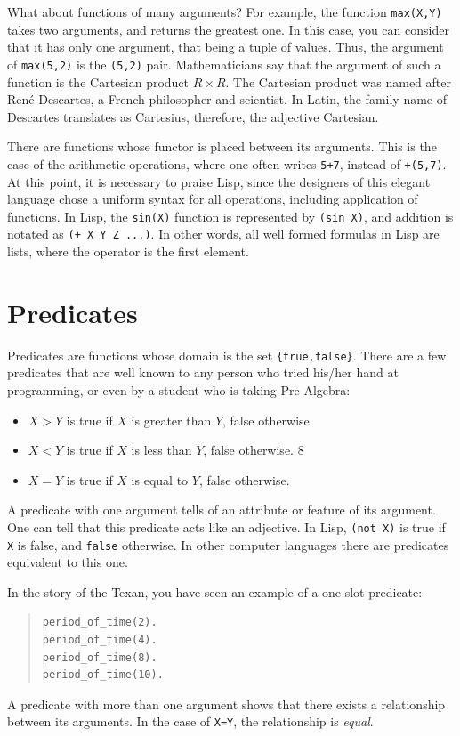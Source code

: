 \documentclass[a4paper,12pt]{book}
\begin{document}
What about functions of many arguments? For example,
the function \verb|max(X,Y)| takes two arguments,
and returns the greatest one. In this case, you can
consider that it has only one argument, that being a
tuple of values. Thus, the argument of \verb|max(5,2)|
is the \verb|(5,2)| pair. Mathematicians say that the
argument of such a function is the Cartesian product
$R\times R$. The Cartesian product was named after
René Descartes, a French philosopher and scientist.
In Latin, the family name of Descartes translates
as Cartesius, therefore, the adjective Cartesian.

There are functions whose functor is placed between
its arguments. This is the case of the arithmetic
operations, where one often writes \verb|5+7|, instead
of \verb|+(5,7)|. At this point, it is necessary to
praise Lisp, since the designers of this elegant language
chose a uniform syntax for all operations, including
application of functions. In Lisp, the \verb|sin(X)|
function is represented by \verb|(sin X)|, and 
addition is notated as \verb|(+ X Y Z ...)|. In other
words, all well formed formulas in Lisp are lists, where
the operator is the first element.

\section{Predicates}
Predicates are functions whose domain is the set
\verb|{true,false}|. There are a few predicates
that are well known to any person who tried his/her
hand at programming, or even by a student who is
taking Pre-Algebra:
\begin{itemize}
\item $X>Y$ is true if $X$ is greater than $Y$, false otherwise.
\item $X<Y$ is true if $X$ is less than $Y$, false otherwise.
8\item $X=Y$ is true if $X$ is equal to $Y$, false otherwise.
\end{itemize}
A predicate with one argument tells of an attribute or feature
of its argument. One can tell that this predicate acts like
an adjective. In Lisp, \verb|(not X)| is true if \verb|X| is
false, and \verb|false| otherwise. In other computer languages
there are predicates equivalent to this one.

\pagebreak
In the story of the Texan, you have seen an example of a one slot predicate:
\begin{quote}
\begin{verbatim}
period_of_time(2).
period_of_time(4).
period_of_time(8).
period_of_time(10).
\end{verbatim}
\end{quote}
A predicate with more than one argument shows that there
exists a relationship between its arguments. In the case of
\verb|X=Y|, the relationship is {\em equal}.
\end{document}
